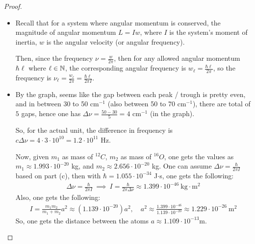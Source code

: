 \documentclass{article}
\begin{document}
\begin{proof}
\begin{itemize}
        \hfil

        \item[(c)] Recall that for a system where angular momentum is conserved, the magnitude of angular momentum $L = I w$, where $I$ is the system's moment of inertia, $w$ is the angular velocity (or angular frequency).
        
        Then, since the frequency $\nu = \frac{w}{2\pi}$, then for any allowed angular momentum $\hbar \ell$ where $\ell \in \mathbb{N}$, the corresponding angular frequency is $w_\ell = \frac{\hbar \ell}{2\pi}$, so the frequency is $\nu_\ell = \frac{w_\ell}{2\pi} = \frac{\hbar \ell}{2\pi I}$.

        \hfil

        \item[(d)] By the graph, seems like the gap between each peak / trough is pretty even, and in between 30 to 50 cm$^{-1}$ (also between 50 to 70 cm$^{-1}$), there are total of $5$ gaps, hence one has $\Delta\nu = \frac{50-30}{5} = 4$ cm$^{-1}$ (in the graph).
        
        So, for the actual unit, the difference in frequency is $c\Delta\nu = 4\cdot 3\cdot 10^{10} = 1.2 \cdot 10^{11}$ Hz.

        Now, given $m_1$ as mass of $^{12}C$, $m_2$ as mass of $^{16}O$, one gets the values as $m_1 \approx 1.993 \cdot 10^{-20}$ kg, and $m_2 \approx 2.656\cdot 10^{-20}$ kg. One can assume $\Delta\nu = \frac{\hbar}{2\pi I}$ based on part (c), then with $\hbar = 1.055\cdot 10^{-34}$ J$\cdot$s, one gets the following:
        \begin{align}
            \Delta\nu = \frac{\hbar}{2\pi I}\ \implies\ I = \frac{\hbar}{2\pi\Delta\nu}\approx 1.399\cdot 10^{-46}\ \text{kg}\cdot\text{m}^2
        \end{align}
        Also, one gets the following:
        \begin{align}
            I = \frac{m_1m_2}{m_1+m_2}a^2 \approx (1.139\cdot 10^{-20})a^2,\quad a^2 \approx \frac{1.399\cdot 10^{-46}}{1.139\cdot 10^{-20}}\approx 1.229\cdot 10^{-26}\ \text{m}^2
        \end{align}
        So, one gets the distance between the atoms $a\approx 1.109\cdot 10^{-13}$m. 
    \end{itemize}
\end{proof}

\newpage
\end{document}
